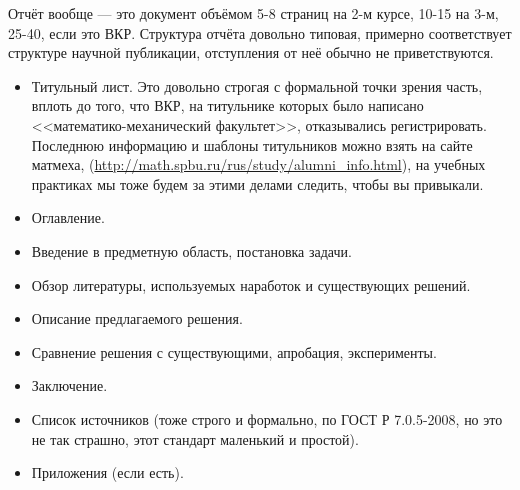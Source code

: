 \documentclass[a5paper]{article}
\begin{document}
Отчёт вообще --- это документ объёмом 5-8 страниц на 2-м курсе, 10-15 на 3-м, 25-40, если это ВКР. Структура отчёта довольно типовая, примерно соответствует структуре научной публикации, отступления от неё обычно не приветствуются.
\begin{itemize}
	\item Титульный лист. Это довольно строгая с формальной точки зрения часть, вплоть до того, что ВКР, на титульнике которых было написано <<математико-механический факультет>>, отказывались регистрировать. Последнюю информацию и шаблоны титульников можно взять на сайте матмеха, (\url{http://math.spbu.ru/rus/study/alumni_info.html}), на учебных практиках мы тоже будем за этими делами следить, чтобы вы привыкали.
	\item Оглавление.
	\item Введение в предметную область, постановка задачи.
	\item Обзор литературы, используемых наработок и существующих решений.
	\item Описание предлагаемого решения.
	\item Сравнение решения с существующими, апробация, эксперименты.
	\item Заключение.
	\item Список источников (тоже строго и формально, по ГОСТ Р 7.0.5-2008, но это не так страшно, этот стандарт маленький и простой).
	\item Приложения (если есть).
\end{itemize}
\end{document}
